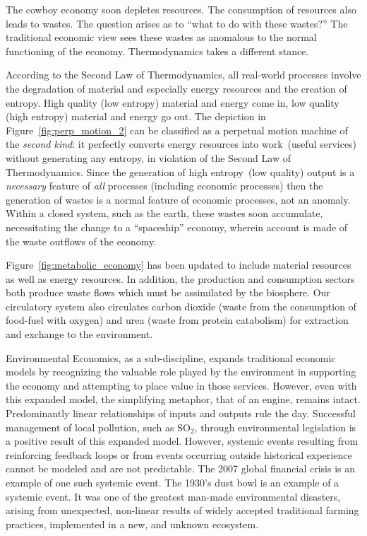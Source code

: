 The cowboy economy soon depletes resources.
The consumption of resources also leads to wastes.
The question arises as to ``what to do with these wastes?''
The traditional economic view sees these wastes as
anomalous to the normal functioning of the economy.\cite{Ayres1969}
Thermodynamics takes a different stance.

According to the Second Law of Thermodynamics,
all real-world processes involve the degradation
of material and especially energy resources
and the creation of entropy.
High quality (low entropy) material and energy come in,
low quality (high entropy) material and energy go out.
The depiction in Figure~\ref{fig:perp_motion_2} 
can be classified as a perpetual motion machine
of the \emph{second kind}:
it perfectly converts energy resources into 
work~(useful services) without generating
any entropy,
in violation of the Second Law of Thermodynamics.
Since the generation of high entropy~(low quality)
output is a \emph{necessary} feature of \emph{all} processes 
(including economic processes)
then the generation of wastes is a normal feature of
economic processes,
not an anomaly.
Within a closed system, such as the earth,
these wastes soon accumulate,
necessitating the change to a ``spaceship'' economy,
wherein account is made of the waste outflows of
the economy.

Figure~\ref{fig:metabolic_economy} has been updated
to include material resources as well as energy resources.
In addition,
the production and consumption sectors both produce
waste flows which must be assimilated by the biosphere.
Our circulatory system also circulates carbon dioxide
(waste from the consumption of food-fuel with oxygen)
and urea (waste from protein catabolism) for extraction
and exchange to the environment.

Environmental Economics, as a sub-discipline, 
expands traditional economic models by recognizing the
valuable role played by the environment in supporting the 
economy and attempting to place value in those services.
However, even with this expanded model, 
the simplifying metaphor,
that of an engine,
remains intact. 
Predominantly linear relationships of inputs and outputs rule the day. 
Successful management of  local pollution, such as SO$_2$, 
through environmental legislation
is a positive result of this expanded model.
However, systemic events resulting from reinforcing feedback loops 
or from events occurring outside historical experience 
cannot be modeled and are not predictable. 
The 2007 global financial crisis is an example of one such systemic event.\cite{Economist2010}
The 1930's dust bowl is an example of a systemic event. 
It was one of the greatest man-made environmental disasters, 
arising from unexpected, non-linear 
results of widely accepted traditional farming practices, 
implemented in a new, and unknown ecosystem.\cite{Lockertz1978} 

